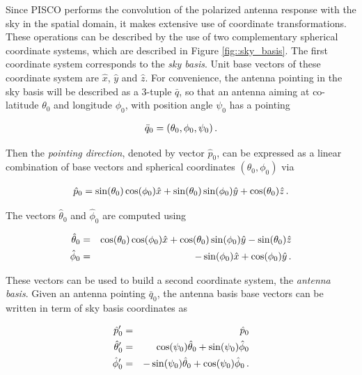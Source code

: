 \documentclass[a4paper,11pt]{article}
\begin{document}
Since PISCO performs the convolution of the polarized antenna response with the sky in the spatial domain, it makes extensive use of coordinate transformations. These operations can be described by the use of two complementary spherical coordinate systems, which are described in Figure \ref{fig::sky_basis}. The first coordinate system corresponds to the \textsl{sky basis}. Unit base vectors of these coordinate system are $\hat{x}$, $\hat{y}$ and $\hat{z}$. For convenience, the antenna pointing in the sky basis will be described as a 3-tuple $\bar{q}$, so that an antenna aiming at co-latitude $\theta_0$ and longitude $\phi_0$, with position angle $\psi_0$ has a pointing 

\begin{equation}
\begin{aligned}
\bar{q}_0= (\theta_0,\phi_0,\psi_0) \, \rm{.}
\end{aligned}
\end{equation}

Then the \textsl{pointing direction}, denoted by vector $\hat{p}_0$, can be expressed as a linear combination of base vectors and spherical coordinates $(\theta_0,\phi_0)$ via

\begin{equation}
\begin{aligned}
\hat{p}_0 = \sin(\theta_0)\cos(\phi_0) \hat{x} + \sin(\theta_0)\sin(\phi_0) \hat{y} + \cos(\theta_0) \hat{z} \, \rm{.}
\end{aligned}
\label{eq::p_sky_basis}
\end{equation}

The vectors $\hat{\theta}_0$ and $\hat{\phi}_0$ are computed using

\begin{eqnarray}
\begin{aligned}
\hat{\theta}_0 &=&  \cos(\theta_0) \cos(\phi_0) \hat{x} + \cos(\theta_0)\sin(\phi_0) \hat{y} - \sin(\theta_0) \hat{z} \\
\hat{\phi}_0   &=&              -\sin(\phi_0) \hat{x} +             \cos(\phi_0) \hat{y} \, \rm{.}
\end{aligned}
\label{eq::tangent_sky_basis}
\end{eqnarray}

These vectors can be used to build a second coordinate system, the \textsl{antenna basis}. Given an antenna pointing $\bar{q}_0$, the antenna basis base vectors can be written in term of sky basis coordinates as 

\begin{eqnarray}
\hat{p}'_0      &=&  \hat{p}_0 \\
\hat{\theta}'_0 &=&  \cos(\psi_0)\hat{\theta}_0 + \sin(\psi_0)\hat{\phi}_0 \\
\hat{\phi}'_0   &=& -\sin(\psi_0)\hat{\theta}_0 + \cos(\psi_0)\hat{\phi}_0 \, \rm{.}
\label{eq::antenna_base_vectors}
\end{eqnarray}
\end{document}
